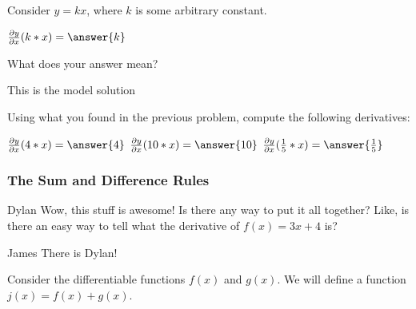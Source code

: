 \documentclass{ximera}
\begin{document}
Consider $y = kx$, where $k$ is some arbitrary constant.
\begin{question}
$ \frac{\partial y}{\partial x} (k*x) =  \answer{k}$
\item{What does your answer mean?}
\begin{freeResponse}
This is the model solution %
\end{freeResponse}
\end{question}

\begin{question}
\item{Using what you found in the previous problem, compute the following derivatives:}

$ \frac{\partial y}{\partial x} (4*x) =  \answer{4}$
$ \frac{\partial y}{\partial x} (10*x) =  \answer{10}$
$ \frac{\partial y}{\partial x} (\frac{1}{5}*x) =  \answer{\frac{1}{5}}$
\end{question}

\subsubsection{The Sum and Difference Rules}
\begin{dialogue}
\item[Dylan] Wow, this stuff is awesome! Is there any way to put it all together? Like, is there an easy way to tell what the derivative of $f(x) = 3x+4$ is?
\item[James] There is Dylan!
\end{dialogue}
Consider the differentiable functions $f(x)$ and $g(x)$. We will define a function $j(x) = f(x) + g(x)$.
\end{document}
